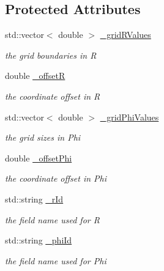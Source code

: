 \subsection*{Protected Attributes}
\begin{DoxyCompactItemize}
\item 
std\+::vector$<$ double $>$ \hyperlink{class_d_d4hep_1_1_d_d_segmentation_1_1_polar_grid_r_phi2_a036c555ece1b698614ed4186f97a72d4}{\+\_\+grid\+R\+Values}
\begin{DoxyCompactList}\small\item\em the grid boundaries in R \end{DoxyCompactList}\item 
double \hyperlink{class_d_d4hep_1_1_d_d_segmentation_1_1_polar_grid_r_phi2_a775bd660c36c5310b65195f3080e92fe}{\+\_\+offsetR}
\begin{DoxyCompactList}\small\item\em the coordinate offset in R \end{DoxyCompactList}\item 
std\+::vector$<$ double $>$ \hyperlink{class_d_d4hep_1_1_d_d_segmentation_1_1_polar_grid_r_phi2_a078188d23dac5d6ed26c85dddf0f9e74}{\+\_\+grid\+Phi\+Values}
\begin{DoxyCompactList}\small\item\em the grid sizes in Phi \end{DoxyCompactList}\item 
double \hyperlink{class_d_d4hep_1_1_d_d_segmentation_1_1_polar_grid_r_phi2_aab823b5b9e861ba2db50721d800d451a}{\+\_\+offset\+Phi}
\begin{DoxyCompactList}\small\item\em the coordinate offset in Phi \end{DoxyCompactList}\item 
std\+::string \hyperlink{class_d_d4hep_1_1_d_d_segmentation_1_1_polar_grid_r_phi2_a93baa19a86e2412bf85fe2749c9d2bb4}{\+\_\+r\+Id}
\begin{DoxyCompactList}\small\item\em the field name used for R \end{DoxyCompactList}\item 
std\+::string \hyperlink{class_d_d4hep_1_1_d_d_segmentation_1_1_polar_grid_r_phi2_a95332f186af59bd325277868ffeb3ea6}{\+\_\+phi\+Id}
\begin{DoxyCompactList}\small\item\em the field name used for Phi \end{DoxyCompactList}\end{DoxyCompactItemize}
